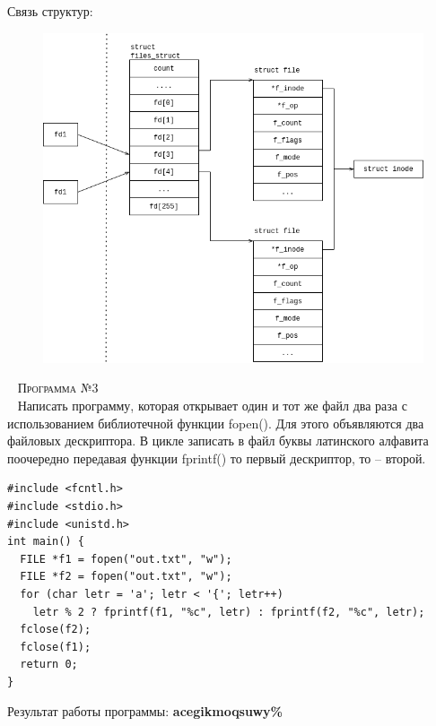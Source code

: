 Связь структур:
\begin{figure}[H]
  \centering
  \includegraphics[scale=0.65]{assets/d_2.png}
\end{figure}

~\newline
\textsc{\huge Программа №3} \\
~\newline
Написать программу, которая открывает один и тот же файл два раза с
использованием библиотечной функции fopen(). Для этого объявляются два файловых
дескриптора. В цикле записать в файл буквы латинского алфавита поочередно
передавая функции fprintf() то первый дескриптор, то – второй.

\begin{lstlisting}
#include <fcntl.h>
#include <stdio.h>
#include <unistd.h>
int main() {
  FILE *f1 = fopen("out.txt", "w");
  FILE *f2 = fopen("out.txt", "w");
  for (char letr = 'a'; letr < '{'; letr++)
    letr % 2 ? fprintf(f1, "%c", letr) : fprintf(f2, "%c", letr);
  fclose(f2);
  fclose(f1);
  return 0;
}
\end{lstlisting}
Результат работы программы:
\textbf{acegikmoqsuwy\%}

